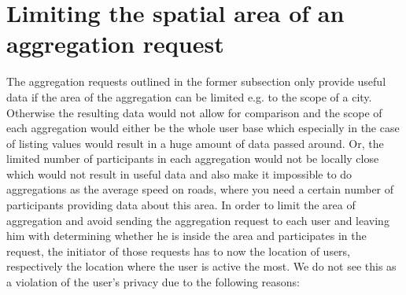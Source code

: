  \section{Limiting the spatial area of an aggregation request}
 The aggregation requests outlined in the former subsection only provide useful data if the area of the aggregation can be limited e.g. to the scope of a city. Otherwise the resulting data would not allow for comparison and the scope of each aggregation would either be the whole user base which especially in the case of listing values would result in a huge amount of data passed around. Or, the limited number of participants in each aggregation would not be locally close which would not result in useful data and also make it impossible to do aggregations as the average speed on roads, where you need a certain number of participants providing data about this area. 
 In order to limit the area of aggregation and avoid sending the aggregation request to each user and leaving him with determining whether he is inside the area and participates in the request, the initiator of those requests has to now the location of users, respectively the location where the user is active the most.
 We do not see this as a violation of the user's privacy due to the following reasons:
